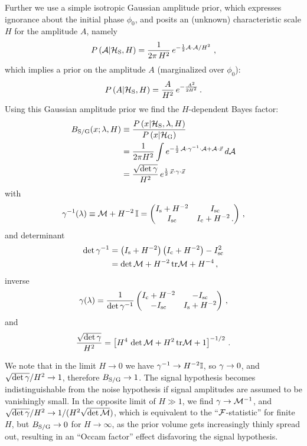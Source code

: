 \documentclass[aps,prd,onecolumn,notitlepage,nofootinbib,superscriptaddress,altaffilletter,floatfix]{revtex4-1}
\begin{document}
Further we use a simple isotropic Gaussian amplitude prior, which expresses ignorance about the initial phase $\phi_0$, and posits an (unknown)
characteristic scale $H$ for the amplitude $A$, namely
\begin{equation}
  \label{eq:22}
  P\left({\mathcal A}\middle|\mathcal{H}_{\mathrm{S}},H\right) = \frac{1}{2\pi\,H^2}\,e^{-\frac{1}{2}{{\mathcal A}\cdot{\mathcal A}}/H^2}\,\,,
\end{equation}
which implies a prior on the amplitude $A$ (marginalized over $\phi_0$):
\begin{equation}
  \label{eq:28}
  P\left(A\middle|\mathcal{H}_{\mathrm{S}}, H\right) = \frac{A}{H^2}\,e^{-\frac{A^2}{2H^2}}\,.
\end{equation}
Using this Gaussian amplitude prior we find the $H$-dependent Bayes factor:
\begin{align}
  \label{eq:29}
  B_{\mathrm{S/G}}(x;\lambda,H) &\equiv \frac{P\left(x\middle|\mathcal{H}_{\mathrm{S}},\lambda,H\right)}{P\left(x\middle|\mathcal{H}_{\mathrm{G}}\right)}\\
  &=\frac{1}{2\pi H^2}\int e^{-\frac{1}{2}\,{\mathcal A}\cdot\gamma^{-1}\cdot{\mathcal A} + {\mathcal A}\cdot\vec{x}}\,d{\mathcal A}\\
  &= \frac{\sqrt{\det\gamma}}{H^2}\, e^{\frac{1}{2}\,\vec{x}\cdot\gamma\cdot\vec{x}}
\end{align}
with
\begin{equation}
  \label{eq:25}
  \gamma^{-1}(\lambda) \equiv \mathcal{M} + H^{-2}\,\mathbb{I} =
  \begin{pmatrix}
    I_{\mathrm{s}} + H^{-2} & I_{\mathrm{sc}} \\
    I_{\mathrm{sc}}        & I_{\mathrm{c}} + H^{-2}\,.
  \end{pmatrix}\,,
\end{equation}
and determinant
\begin{align}
  \label{eq:39}
  \det\gamma^{-1} &= \left(I_{\mathrm{s}} + H^{-2}\right)\left(I_{\mathrm{c}}+H^{-2}\right) - I_{\mathrm{sc}}^2\\
  &=\det\mathcal{M} + H^{-2}\,\mathrm{tr}\mathcal{M} + H^{-4}\,,
\end{align}
inverse
\begin{equation}
  \label{eq:41}
  \gamma(\lambda) = \frac{1}{\det\gamma^{-1}}
  \begin{pmatrix}
    I_{\mathrm{c}} + H^{-2} & -I_{\mathrm{sc}} \\
    -I_{\mathrm{sc}}        & I_{\mathrm{s}} + H^{-2}
  \end{pmatrix}\,,
\end{equation}
and
\begin{equation}
  \label{eq:40}
  \frac{\sqrt{\det\gamma}}{H^2} = \left[H^4\,\det\mathcal{M} + H^2\,\mathrm{tr}\mathcal{M} + 1\right]^{-1/2}\,.
\end{equation}

We note that in the limit $H\rightarrow0$ we have $\gamma^{-1}\rightarrow H^{-2}\mathbb{I}$, so $\gamma\rightarrow0$, and
$\sqrt{\det\gamma}/H^2\rightarrow 1$, therefore $B_{\mathrm{S/G}}\rightarrow 1$.
The signal hypothesis becomes indistinguishable from the noise hypothesis if signal amplitudes are assumed to be vanishingly small.
In the opposite limit of $H\gg 1$, we find $\gamma\rightarrow\mathcal{M}^{-1}$, and $\sqrt{\det\gamma}/H^2\rightarrow 1/(H^2\sqrt{\det\mathcal{M}})$, which is equivalent to
the ``$\mathcal{F}$-statistic'' for finite $H$, but $B_{\mathrm{S/G}}\rightarrow 0$ for $H\rightarrow \infty$, as the prior volume gets increasingly thinly spread out,
resulting in an ``Occam factor'' effect disfavoring the signal hypothesis.
\end{document}
